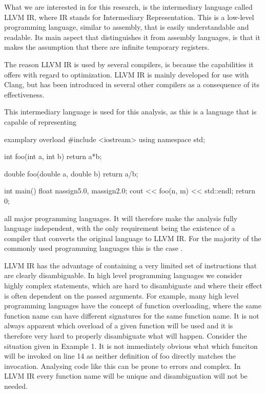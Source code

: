 \documentclass[11pt]{article}
\begin{document}
\begin{multicols}{2}
What we are interested in for this research, is the intermediary language called LLVM IR, where IR stands for Intermediary Representation. This is a low-level programming language, similar to assembly, that is easily understandable and readable. Its main aspect that distinguishes it from assembly languages, is that it makes the assumption that there are infinite temporary registers. 

The reason LLVM IR is used by several compilers, is because the capabilities it offers with regard to optimization. LLVM IR is mainly developed for use with Clang, but has been introduced in several other compilers as a consequence of its effectiveness.

This intermediary language is used for this analysis, as this is a language that is capable of representing 
\begin{sexylisting}{examplary overload\label{lst:example0}}
#include <iostream>
using namespace std;

int foo(int a, int b) {
  return a*b;
}

double foo(double a, double b) {
  return a/b;
}

int main() {
  float nassign5.0, massign2.0;
  cout << foo(n, m) << std::endl;
  return 0;	
}
\end{sexylisting}
all major programming languages. It will therefore make the analysis fully language independent, with the only requirement being the existence of a compiler that converts the original language to LLVM IR. For the majority of the commonly used programming languages this is the case \cite{balasubramanian2017system, lattner2008llvm, lam2015numba}.

LLVM IR has the advantage of containing a very limited set of instructions that are clearly disambiguable. In high level programming languages we consider highly complex statements, which are hard to disambiguate and where their effect is often dependent on the passed arguments. For example, many high level programming languages have the concept of function overloading, where the same function name can have different signatures for the same function name. It is not always apparent which overload of a given function will be used and it is therefore very hard to properly disambiguate what will happen. Consider the situation given in Example 1. It is not immediately obvious what which funciton will be invoked on line 14 as neither definition of foo directly matches the invocation. Analysing code like this can be prone to errors and complex. In LLVM IR every function name will be unique and disambiguation will not be needed.


\end{multicols}
\end{document}
